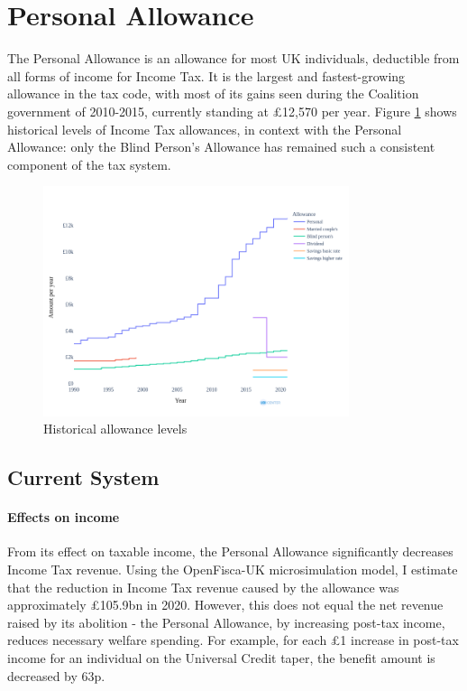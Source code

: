 \documentclass{article}
\begin{document}
    \section{Personal Allowance}
    The Personal Allowance is an allowance for most UK individuals, deductible from all forms of income for Income Tax. It is the largest and fastest-growing allowance in the tax code, with most of its gains seen during the Coalition government of 2010-2015, currently standing at £12,570 per year. Figure \ref{fig:PA_hist} shows historical levels of Income Tax allowances, in context with the Personal Allowance: only the Blind Person's Allowance has remained such a consistent component of the tax system.
    \begin{figure}
        \centering
        \includegraphics[width=0.8\textwidth]{images/fig_1.png}
        \caption{Historical allowance levels}
        \label{fig:PA_hist}
    \end{figure}

    \subsection{Current System}

    \paragraph{Effects on income}

    From its effect on taxable income, the Personal Allowance significantly decreases Income Tax revenue. Using the OpenFisca-UK microsimulation model, I estimate that the reduction in Income Tax revenue caused by the allowance was approximately £105.9bn in 2020. However, this does not equal the net revenue raised by its abolition - the Personal Allowance, by increasing post-tax income, reduces necessary welfare spending. For example, for each £1 increase in post-tax income for an individual on the Universal Credit taper, the benefit amount is decreased by 63p. 
    
\end{document}
